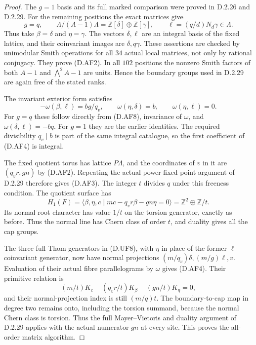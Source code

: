 \begin{proof}
The $g=1$ basis and its full marked comparison were proved in
D.2.26 and D.2.29. For the remaining positions the exact
matrices give
\[
 g=q,\qquad
 \Lambda/(A-1)\Lambda=\mathbb Z[\delta]\oplus\mathbb Z[\gamma],
 \qquad
 \ell=(q/d)N_d\gamma\in\Lambda.                            \tag{D.AF8}
\]
Thus take $\beta=\delta$ and $\eta=\gamma$.
The vectors $\delta,\ell$ are an integral basis of the fixed
lattice, and their coinvariant images are $\delta,q\gamma$.
These assertions are checked by unimodular Smith operations
for all $34$ actual local matrices, not only by rational
conjugacy. They prove (D.AF2). In all $102$ positions the
nonzero Smith factors of both $A-1$ and
$\bigwedge^2A-1$ are units. Hence the boundary groups used
in D.2.29 are again free of the stated ranks.

The invariant exterior form satisfies
\[
 -\omega(\beta,\ell)=bg/q_v,\qquad
 \omega(\eta,\delta)=b,\qquad
 \omega(\eta,\ell)=0.
\]
For $g=q$ these follow directly from (D.AF8), invariance of
$\omega$, and $\omega(\delta,\ell)=-bq$.
For $g=1$ they are the earlier identities. The required
divisibility $q_v\mid b$ is part of the same integral
catalogue, so the first coefficient of (D.AF4) is integral.

The fixed quotient torus has lattice $P\Lambda$, and the
coordinates of $v$ in it are $(q_vr,gn)$ by (D.AF2).
Repeating the actual-power fixed-point argument of D.2.29
therefore gives (D.AF3). The integer $t$ divides $q$ under
this freeness condition. The quotient surface has
\[
 H_1(F)=\langle\beta,\eta,c\mid
                   mc-q_vr\beta-gn\eta=0\rangle
       =\mathbb Z^2\oplus\mathbb Z/t.
\]
Its normal root character has value $1/t$ on the torsion
generator, exactly as before. Thus the normal line has Chern
class of order $t$, and duality gives all the cap groups.

The three full Thom generators in (D.UF8), with $\eta$ in
place of the former $\ell$ coinvariant generator, now have
normal projections $(m/q_v)\delta,(m/g)\ell,v$.
Evaluation of their actual fibre parallelograms by $\omega$
gives (D.AF4). Their primitive relation is
\[
 (m/t)K_c-(q_vr/t)K_\beta-(gn/t)K_\eta=0,
\]
and their normal-projection index is still $(m/q)t$.
The boundary-to-cap map in degree two remains onto, including
the torsion summand, because the normal Chern class is
torsion. Thus the full Mayer--Vietoris and duality argument of
D.2.29 applies with the actual numerator $gn$ at every site.
This proves the all-order matrix algorithm.


\end{proof}
